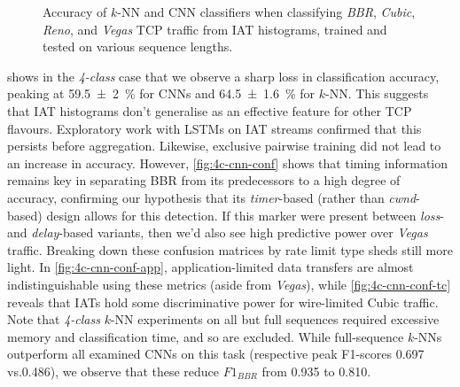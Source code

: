 \begin{figure}
    \centering
    \vspace{-0.25cm}
    \caption{Accuracy of $k$-NN and CNN classifiers when classifying \emph{BBR}, \emph{Cubic}, \emph{Reno}, and \emph{Vegas} TCP traffic from IAT histograms, trained and tested on various sequence lengths.}
    \label{fig:4c-results}
    \vspace{-0.5cm}
\end{figure}

 shows in the \emph{4-class} case that we observe a sharp loss in classification accuracy, peaking at \SI{59.5 +- 2}{\percent} for CNNs and \SI{64.5 +- 1.6}{\percent} for $k$-NN.
This suggests that IAT histograms don't generalise as an effective feature for other TCP flavours.
Exploratory work with LSTMs on IAT streams confirmed that this persists before aggregation.
Likewise, exclusive pairwise training did not lead to an increase in accuracy.
However, \cref{fig:4c-cnn-conf} shows that timing information remains key in separating BBR from its predecessors to a high degree of accuracy, confirming our hypothesis that its \emph{timer}-based (rather than \emph{cwnd}-based) design allows for this detection.
If this marker were present between \emph{loss}- and \emph{delay}-based variants, then we'd also see high predictive power over \emph{Vegas} traffic.
Breaking down these confusion matrices by rate limit type sheds still more light.
In \cref{fig:4c-cnn-conf-app}, application-limited data transfers are almost indistinguishable using these metrics (aside from \emph{Vegas}), while \cref{fig:4c-cnn-conf-tc} reveals that IATs hold some discriminative power for wire-limited Cubic traffic.
Note that \emph{4-class} $k$-NN experiments on all but full sequences required excessive memory and classification time, and so are excluded.
While full-sequence $k$-NNs outperform all examined CNNs on this task (respective peak F1-scores \num{0.697} vs.\@ \num{0.486}), we observe that these reduce $\mathit{F1}_\mathit{BBR}$ from \num{0.935} to \num{0.810}.

